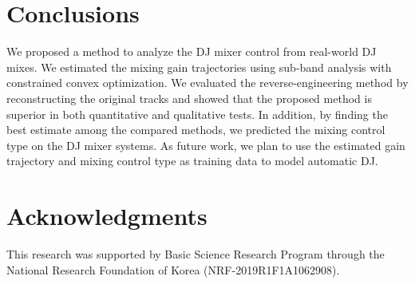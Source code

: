 \documentclass[sigconf]{nimeart}
\begin{document}
\section{Conclusions}\label{conclusions}

We proposed a method to analyze the DJ mixer control from real-world DJ mixes. We estimated the mixing gain trajectories using sub-band analysis with constrained convex optimization. We evaluated the reverse-engineering method by reconstructing the original tracks and showed that the proposed method is superior in both quantitative and qualitative tests. In addition, by finding the best estimate among the compared methods, we predicted the mixing control type on the DJ mixer systems. As future work, we plan to use the estimated gain trajectory and mixing control type as training data to model automatic DJ.

\section{Acknowledgments}\label{acknowledgments}

This research was supported by Basic Science Research Program through the National Research Foundation of Korea (NRF-2019R1F1A1062908).
\end{document}

